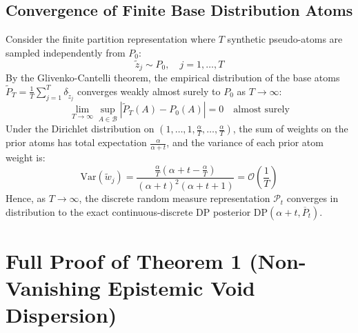 \documentclass{article}
\begin{document}
\subsection{Convergence of Finite Base Distribution Atoms}
Consider the finite partition representation where $T$ synthetic pseudo-atoms are sampled independently from $P_0$:
\begin{equation}
\tilde{z}_j \sim P_0, \quad j=1, \dots, T
\end{equation}
By the Glivenko-Cantelli theorem, the empirical distribution of the base atoms $\widetilde{P}_T = \frac{1}{T} \sum_{j=1}^T \delta_{\tilde{z}_j}$ converges weakly almost surely to $P_0$ as $T \to \infty$:
\begin{equation}
\lim_{T \to \infty} \sup_{A \in \mathcal{B}} |\widetilde{P}_T(A) - P_0(A)| = 0 \quad \text{almost surely}
\end{equation}
Under the Dirichlet distribution on $(1, \dots, 1, \frac{\alpha}{T}, \dots, \frac{\alpha}{T})$, the sum of weights on the prior atoms has total expectation $\frac{\alpha}{\alpha + t}$, and the variance of each prior atom weight is:
\begin{equation}
\mathrm{Var}(\widetilde{w}_j) = \frac{\frac{\alpha}{T}(\alpha + t - \frac{\alpha}{T})}{(\alpha + t)^2 (\alpha + t + 1)} = \mathcal{O}\left(\frac{1}{T}\right)
\end{equation}
Hence, as $T \to \infty$, the discrete random measure representation $\mathcal{P}_t$ converges in distribution to the exact continuous-discrete DP posterior $\mathrm{DP}(\alpha + t, \overline{P}_t)$.

\section{Full Proof of Theorem 1 (Non-Vanishing Epistemic Void Dispersion)}
\label{app:proof_thm1}
\end{document}
